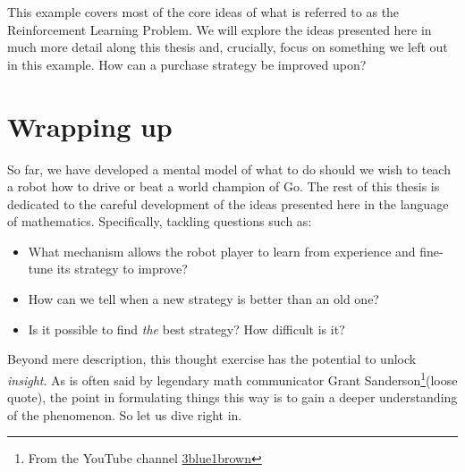 This example covers most of the core ideas of what is referred to as the
Reinforcement Learning Problem. We will explore the ideas presented here in much
more detail along this thesis and, crucially, focus on something we left out in
this example. How can a purchase strategy be improved upon?

\section{Wrapping up}
So far, we have developed a mental model of what to do should we wish to teach a
robot how to drive or beat a world champion of Go. The rest of this thesis is
dedicated to the careful development of the ideas presented here in the language
of mathematics. Specifically, tackling questions such as:
\begin{itemize}
	\item What mechanism allows the robot player to learn from experience and
		fine-tune its strategy to improve?
	\item How can we tell when a new strategy is better than an old one?
	\item Is it possible to find \textit{the} best strategy?  How difficult is
		it?
\end{itemize}

Beyond mere description, this thought exercise has the potential to unlock
\textit{insight}. As is often said by legendary math communicator Grant
Sanderson\footnote{From the YouTube channel
\href{https://www.youtube.com/channel/UCYO_jab_esuFRV4b17AJtAw}{3blue1brown}}(loose
quote), the point in formulating things this way is to gain a deeper
understanding of the phenomenon. So let us dive right in.